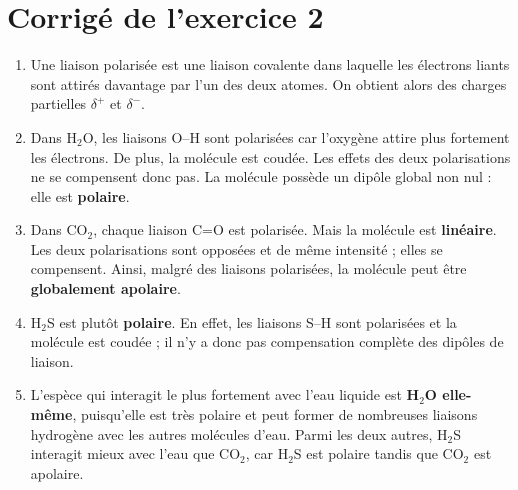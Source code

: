 \documentclass[11pt,a4paper]{article}
\begin{document}
\section*{Corrigé de l'exercice 2}
\begin{enumerate}[label=\textbf{\arabic*.},leftmargin=1.2em]
    \item Une liaison polarisée est une liaison covalente dans laquelle les électrons liants sont attirés davantage par l'un des deux atomes. On obtient alors des charges partielles $\delta^+$ et $\delta^-$.

    \item Dans H$_2$O, les liaisons O--H sont polarisées car l'oxygène attire plus fortement les électrons. De plus, la molécule est coudée. Les effets des deux polarisations ne se compensent donc pas. La molécule possède un dipôle global non nul : elle est \textbf{polaire}.

    \item Dans CO$_2$, chaque liaison C=O est polarisée. Mais la molécule est \textbf{linéaire}. Les deux polarisations sont opposées et de même intensité ; elles se compensent. Ainsi, malgré des liaisons polarisées, la molécule peut être \textbf{globalement apolaire}.

    \item H$_2$S est plutôt \textbf{polaire}. En effet, les liaisons S--H sont polarisées et la molécule est coudée ; il n'y a donc pas compensation complète des dipôles de liaison.

    \item L'espèce qui interagit le plus fortement avec l'eau liquide est \textbf{H$_2$O elle-même}, puisqu'elle est très polaire et peut former de nombreuses liaisons hydrogène avec les autres molécules d'eau. Parmi les deux autres, H$_2$S interagit mieux avec l'eau que CO$_2$, car H$_2$S est polaire tandis que CO$_2$ est apolaire.
\end{enumerate}
\end{document}
